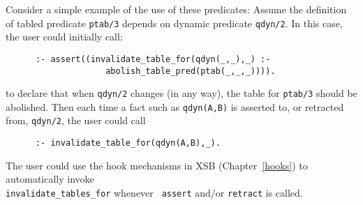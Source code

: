 \begin{description}
\begin{description}
{Consider a simple example of the use of these predicates: Assume the
definition of tabled predicate {\tt ptab/3} depends on dynamic predicate
{\tt qdyn/2}.  In this case, the user could initially call:
\begin{verbatim}
      :- assert((invalidate_table_for(qdyn(_,_),_) :-
                    abolish_table_pred(ptab(_,_,_)))).
\end{verbatim}
to declare that when {\tt qdyn/2} changes (in any way), the table for {\tt ptab/3}
should be abolished.  Then each time a fact such as {\tt qdyn(A,B)} is
asserted to, or retracted from, {\tt qdyn/2}, the user could call
\begin{verbatim}
      :- invalidate_table_for(qdyn(A,B),_).
\end{verbatim}

The user could use the hook mechanisms in XSB (Chapter~\ref{hooks}) to
automatically invoke \\ {\tt invalidate\_tables\_for} whenever {\tt
  assert} and/or {\tt retract} is called.

}

\end{description}




\comment{


%

}



\end{description}
